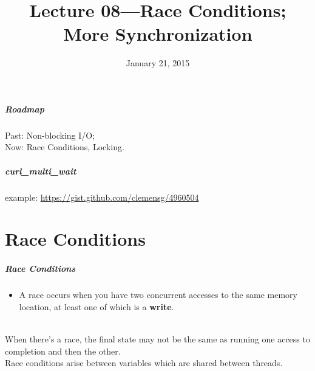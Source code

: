 \documentclass[aspectratio=43]{beamer}
\title{Lecture 08---Race Conditions; More Synchronization}
\date{January 21, 2015}
\newenvironment{changemargin}[1]{%
  \begin{list}{}{%
    \setlength{\topsep}{0pt}%
    \setlength{\leftmargin}{#1}%
    \setlength{\rightmargin}{1em}
    \setlength{\listparindent}{\parindent}%
    \setlength{\itemindent}{\parindent}%
    \setlength{\parsep}{\parskip}%
  }%
  \item[]}{\end{list}}
\begin{document}
\begin{frame}[plain]
  \titlepage
\end{frame}

\begin{frame}
  \frametitle{Roadmap}

  \Large
    \begin{changemargin}{2cm}
  Past: Non-blocking I/O;\\[1em]

  Now: Race Conditions, Locking.
    \end{changemargin}
  
\end{frame}

\begin{frame}
  \frametitle{curl\_multi\_wait}

  \begin{changemargin}{2.5cm}
    example: \url{https://gist.github.com/clemensg/4960504}
  \end{changemargin}

\end{frame}

\part{Race Conditions}
\frame{\partpage}

\begin{frame}
  \frametitle{Race Conditions}

  \begin{changemargin}{2.5cm}
  \begin{itemize}
    \item A race occurs when you have two concurrent accesses to the
      same memory location, at least one of which is a {\bf write}.
  \end{itemize}~\\

   When there's a race, the final state may not be the same as
      running one access to completion and then the other.\\[1em]
   Race conditions arise between variables which
      are shared between threads.
  \end{changemargin}

\end{frame}
\end{document}
